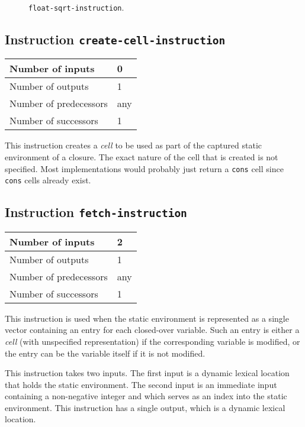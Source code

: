 \begin{figure}
\begin{center}
\end{center}
\caption{\label{fig-float-sqrt-instruction}
\texttt{float-sqrt-instruction}.}
\end{figure}

\subsection{Instruction \texttt{create-cell-instruction}}
\label{mir-instruction-create-cell}

\begin{tabular}{|l|l|}
\hline
Number of inputs & 0\\
\hline
Number of outputs & 1\\
\hline
Number of predecessors & any\\
\hline
Number of successors & 1\\
\hline
\end{tabular}

This instruction creates a \emph{cell} to be used as part of the
captured static environment of a closure.  The exact nature of the
cell that is created is not specified.  Most implementations would
probably just return a \texttt{cons} cell since \texttt{cons} cells
already exist.

\subsection{Instruction \texttt{fetch-instruction}}
\label{mir-instruction-fetch}

\begin{tabular}{|l|l|}
\hline
Number of inputs & 2\\
\hline
Number of outputs & 1\\
\hline
Number of predecessors & any\\
\hline
Number of successors & 1\\
\hline
\end{tabular}

This instruction is used when the static environment is represented as
a single vector containing an entry for each closed-over variable.
Such an entry is either a \emph{cell} (with unspecified
representation) if the corresponding variable is modified, or the
entry can be the variable itself if it is not modified.

This instruction takes two inputs.  The first input is a dynamic
lexical location that holds the static environment.  The second input
is an immediate input containing a non-negative integer and which
serves as an index into the static environment.  This instruction has
a single output, which is a dynamic lexical location.

